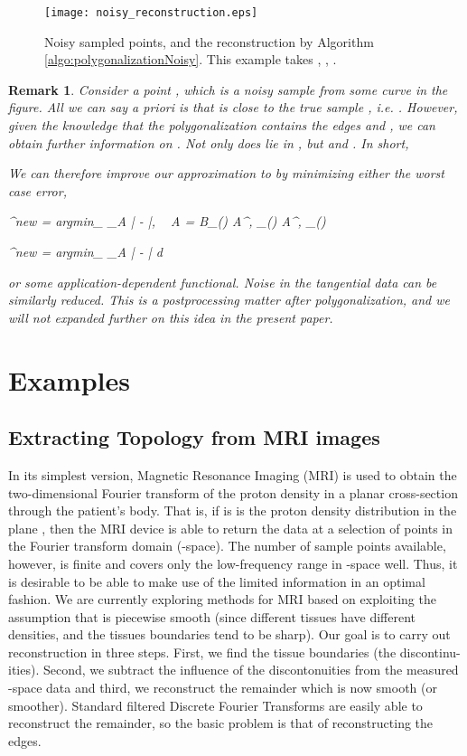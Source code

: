 \documentclass{article}
\newtheorem{varremark}[cntr]{Remark}
\newenvironment{remark}{\begin{varremark}\em}{\em\end{varremark}}
\numberwithin{cntr}{section}
\numberwithin{equation}{section}
\newcommand{\abs}[1]{\left| #1 \right|}\newcommand{\absSmall}[1]{| #1 |}\newcommand{\RR}[0]{{\mathbb{R}}}
\newcommand{\vx}[0]{{\vec{x}}}
\newcommand{\vp}[0]{{\vec{p}}}
\newcommand{\vq}[0]{{\vec{q}}}
\newcommand{\vr}[0]{{\vec{r}}}
\newcommand{\ball}[2]{ { B_{#1}(#2) } }
\newcommand{\pointNoise}{{\zeta}}
\newcommand{\tanNoise}{{\xi}}
\newcommand{\nallowed}[2]{ { A^{\pointNoise, \tanNoise}_{#1}(#2) } }
\begin{document}
\begin{figure}
\setlength{\unitlength}{0.240900pt}
\ifx\plotpoint\undefined\newsavebox{\plotpoint}\fi
\sbox{\plotpoint}{\rule[-0.200pt]{0.400pt}{0.400pt}}\texttt{[image: noisy\_reconstruction.eps]}
\caption{Noisy sampled points, and the reconstruction by Algorithm \ref{algo:polygonalizationNoisy}. This example takes , , . }
\label{fig:noisyreconstruction}
\end{figure}

\begin{remark}
Consider a point , which is a noisy sample from some curve in the figure.
All we can say a priori is that  is close to the true
sample , i.e. .
However, given the knowledge that the polygonalization contains
the edges  and , we can obtain further information
on . Not only does  lie in ,
but  and
. In short,

We can therefore improve our approximation to  by minimizing
either the worst case error,

    \vp^{new} = \textrm{argmin}_{\vp}  \sup_{\vx \in A} \abs{\vp - \vx}, ~ A = \ball{\pointNoise}{\vp} \cap \nallowed{\epsilon}{\vq} \cap  \nallowed{\epsilon}{\vr}
  
    \vp^{new} = \textrm{argmin}_{\vp}  \int_{A} \abs{\vp - \vx} d\vx
  
or some application-dependent functional.
Noise in the tangential data can be similarly reduced.
This is a postprocessing matter after polygonalization,
and we will not expanded further on this idea in the present paper.
\end{remark}

\section{Examples}

\subsection{Extracting Topology from MRI images}

In its simplest version, Magnetic Resonance Imaging (MRI) is
used to obtain the
two-dimensional Fourier transform of the proton density in a
planar cross-section through the patient's body.
That is, if  is
is the proton density distribution in the plane , then the MRI device
is able to return the data  at a selection of
points  in the Fourier transform domain (-space).
The number of sample points available, however, is finite and covers
only the low-frequency range in -space well.
Thus, it is desirable to be able to make use of the limited
information in an optimal fashion.
We are currently exploring methods for MRI based on
exploiting the assumption that
 is piecewise smooth (since different tissues have different
densities, and the tissues boundaries tend to be sharp).
Our goal is to carry out reconstruction in three steps.
First, we find the tissue boundaries (the discontinu-
ities). Second, we subtract the influence of the discontonuities from
the measured -space data and third, we reconstruct the remainder which
is now smooth (or smoother). Standard filtered Discrete Fourier Transforms
are easily able to reconstruct the remainder, so the basic
problem is that of reconstructing the edges.
\end{document}

